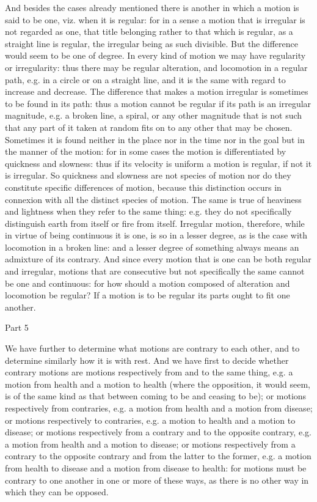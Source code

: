 And besides the cases already mentioned there is another in which
a motion is said to be one, viz. when it is regular: for in a sense
a motion that is irregular is not regarded as one, that title belonging
rather to that which is regular, as a straight line is regular, the
irregular being as such divisible. But the difference would seem to
be one of degree. In every kind of motion we may have regularity or
irregularity: thus there may be regular alteration, and locomotion
in a regular path, e.g. in a circle or on a straight line, and it
is the same with regard to increase and decrease. The difference that
makes a motion irregular is sometimes to be found in its path: thus
a motion cannot be regular if its path is an irregular magnitude,
e.g. a broken line, a spiral, or any other magnitude that is not such
that any part of it taken at random fits on to any other that may
be chosen. Sometimes it is found neither in the place nor in the time
nor in the goal but in the manner of the motion: for in some cases
the motion is differentiated by quickness and slowness: thus if its
velocity is uniform a motion is regular, if not it is irregular. So
quickness and slowness are not species of motion nor do they constitute
specific differences of motion, because this distinction occurs in
connexion with all the distinct species of motion. The same is true
of heaviness and lightness when they refer to the same thing: e.g.
they do not specifically distinguish earth from itself or fire from
itself. Irregular motion, therefore, while in virtue of being continuous
it is one, is so in a lesser degree, as is the case with locomotion
in a broken line: and a lesser degree of something always means an
admixture of its contrary. And since every motion that is one can
be both regular and irregular, motions that are consecutive but not
specifically the same cannot be one and continuous: for how should
a motion composed of alteration and locomotion be regular? If a motion
is to be regular its parts ought to fit one another. 

Part 5

We have further to determine what motions are contrary to each other,
and to determine similarly how it is with rest. And we have first
to decide whether contrary motions are motions respectively from and
to the same thing, e.g. a motion from health and a motion to health
(where the opposition, it would seem, is of the same kind as that
between coming to be and ceasing to be); or motions respectively from
contraries, e.g. a motion from health and a motion from disease; or
motions respectively to contraries, e.g. a motion to health and a
motion to disease; or motions respectively from a contrary and to
the opposite contrary, e.g. a motion from health and a motion to disease;
or motions respectively from a contrary to the opposite contrary and
from the latter to the former, e.g. a motion from health to disease
and a motion from disease to health: for motions must be contrary
to one another in one or more of these ways, as there is no other
way in which they can be opposed. 

